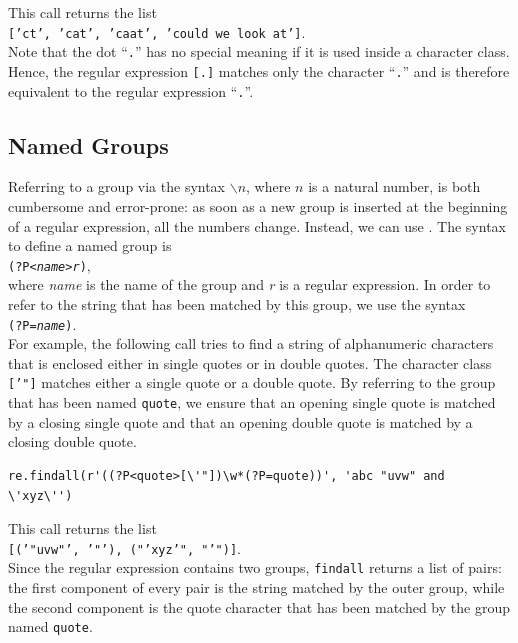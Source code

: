 \noindent
This call returns the list
\\[0.2cm]
\hspace*{1.3cm}
\texttt{['ct', 'cat', 'caat', 'could we look at']}.
\\[0.2cm]
Note that the dot ``\texttt{.}'' has no special meaning if it is used inside a character class.  Hence, the
regular expression \texttt{[.]} matches only the character ``\texttt{.}'' and is therefore equivalent to the
regular expression ``\texttt{.}''.

\subsection{Named Groups}
Referring to a group via the syntax $\backslash n$, where $n$ is a natural number, is both cumbersome and
error-prone: as soon as a new group is inserted at the beginning of a regular expression, all the numbers change.
Instead, we can use .  The syntax to define a named group is
\\[0.2cm]
\hspace*{1.3cm}
\texttt{(?P<\textsl{name}>\textsl{r})},
\\[0.2cm]
where \textsl{name} is the name of the group and \textsl{r} is a regular expression.  In order to refer to the
string that has been matched by this group, we use the syntax
\\[0.2cm]
\hspace*{1.3cm}
\texttt{(?P=\textsl{name})}.
\\[0.2cm]
For example, the following call tries to find a string of alphanumeric characters that is enclosed either in
single quotes or in double quotes.  The character class \texttt{['"]} matches either a single quote
or a double quote.  By referring to the group that has been named \texttt{quote}, we ensure that an opening
single quote is matched by a closing single quote and that an opening double quote is matched by a closing
double quote.

\begin{verbatim}
re.findall(r'((?P<quote>[\'"])\w*(?P=quote))', 'abc "uvw" and \'xyz\'')
\end{verbatim}

\noindent
This call returns the list
\\[0.2cm]
\hspace*{1.3cm}
\texttt{[('"uvw"', '"'), ("'xyz'", "'")]}.
\\[0.2cm]
Since the regular expression contains two groups, \texttt{findall} returns a list of pairs: the first component
of every pair is the string matched by the outer group, while the second component is the quote character that
has been matched by the group named \texttt{quote}.

